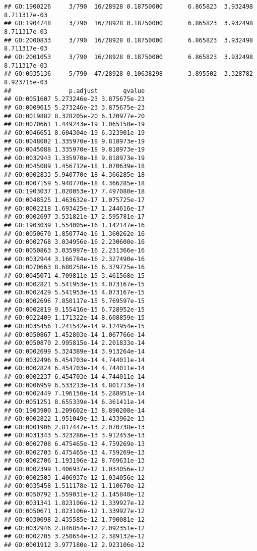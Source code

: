 \documentclass[
]{article}
\begin{document}
\begin{verbatim}
## GO:1900226     3/790  16/28928 0.18750000       6.865823  3.932498 8.711317e-03
## GO:1904748     3/790  16/28928 0.18750000       6.865823  3.932498 8.711317e-03
## GO:2000833     3/790  16/28928 0.18750000       6.865823  3.932498 8.711317e-03
## GO:2001053     3/790  16/28928 0.18750000       6.865823  3.932498 8.711317e-03
## GO:0035136     5/790  47/28928 0.10638298       3.895502  3.328782 8.923715e-03
##                p.adjust       qvalue
## GO:0051607 5.273246e-23 3.875675e-23
## GO:0009615 5.273246e-23 3.875675e-23
## GO:0019882 8.328205e-20 6.120977e-20
## GO:0070661 1.449243e-19 1.065150e-19
## GO:0046651 8.604304e-19 6.323901e-19
## GO:0048002 1.335970e-18 9.818973e-19
## GO:0045088 1.335970e-18 9.818973e-19
## GO:0032943 1.335970e-18 9.818973e-19
## GO:0045089 1.456712e-18 1.070639e-18
## GO:0002833 5.940770e-18 4.366285e-18
## GO:0007159 5.940770e-18 4.366285e-18
## GO:1903037 1.020053e-17 7.497080e-18
## GO:0048525 1.463632e-17 1.075725e-17
## GO:0002218 1.693425e-17 1.244616e-17
## GO:0002697 3.531821e-17 2.595781e-17
## GO:1903039 1.554005e-16 1.142147e-16
## GO:0050670 1.850774e-16 1.360262e-16
## GO:0002768 3.034956e-16 2.230600e-16
## GO:0050863 3.035997e-16 2.231366e-16
## GO:0032944 3.166784e-16 2.327490e-16
## GO:0070663 8.680258e-16 6.379725e-16
## GO:0045071 4.709811e-15 3.461568e-15
## GO:0002821 5.541953e-15 4.073167e-15
## GO:0002429 5.541953e-15 4.073167e-15
## GO:0002696 7.850117e-15 5.769597e-15
## GO:0002819 9.155416e-15 6.728952e-15
## GO:0022409 1.171322e-14 8.608859e-15
## GO:0035456 1.241542e-14 9.124954e-15
## GO:0050867 1.452803e-14 1.067766e-14
## GO:0050870 2.995815e-14 2.201833e-14
## GO:0002699 5.324389e-14 3.913264e-14
## GO:0032496 6.454703e-14 4.744011e-14
## GO:0002824 6.454703e-14 4.744011e-14
## GO:0002237 6.454703e-14 4.744011e-14
## GO:0006959 6.533213e-14 4.801713e-14
## GO:0002449 7.196150e-14 5.288951e-14
## GO:0051251 8.655339e-14 6.361411e-14
## GO:1903900 1.209602e-13 8.890208e-14
## GO:0002822 1.951049e-13 1.433962e-13
## GO:0001906 2.817447e-13 2.070738e-13
## GO:0031343 5.323286e-13 3.912453e-13
## GO:0002708 6.475465e-13 4.759269e-13
## GO:0002703 6.475465e-13 4.759269e-13
## GO:0002706 1.193196e-12 8.769631e-13
## GO:0002399 1.406937e-12 1.034056e-12
## GO:0002503 1.406937e-12 1.034056e-12
## GO:0035458 1.511178e-12 1.110670e-12
## GO:0050792 1.559031e-12 1.145840e-12
## GO:0031341 1.823106e-12 1.339927e-12
## GO:0050671 1.823106e-12 1.339927e-12
## GO:0030098 2.435585e-12 1.790081e-12
## GO:0032946 2.846854e-12 2.092351e-12
## GO:0002705 3.250654e-12 2.389132e-12
## GO:0001912 3.977180e-12 2.923106e-12

\end{verbatim}
\end{document}
